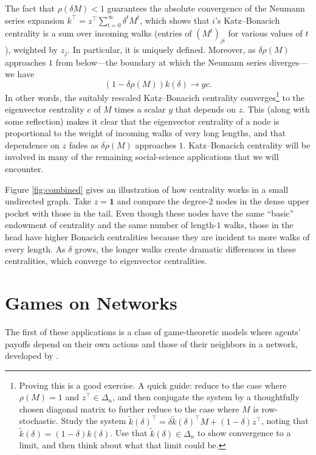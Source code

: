 \documentclass{notices}
\theoremstyle{definition}\newtheorem{problem}{Problem}
\theoremstyle{definition} \newtheorem{remark}{Remark}
\theoremstyle{definition} \newtheorem{claim}{Claim}
\theoremstyle{definition} \newtheorem{thm}{Theorem}
\theoremstyle{definition} \newtheorem*{thmNoNum}{Theorem}
\theoremstyle{definition} \newtheorem{definition}{Definition}
\theoremstyle{definition} \theoremstyle{remark}
\theoremstyle{definition} \newtheorem{note}{Note}
\theoremstyle{definition} \newtheorem{notation}{Notation}
\theoremstyle{definition} \theoremstyle{plain}
\theoremstyle{definition} \newtheorem{condition}{Condition}
\theoremstyle{definition} \newtheorem{lem}{Lemma}
\theoremstyle{definition} \newtheorem{corollary}{Corollary}
\theoremstyle{definition} \newtheorem{prop}{Proposition}
\theoremstyle{definition} \newtheorem{ax}{Axiom}
\theoremstyle{definition} \newtheorem{assumption}{Assumption}
\theoremstyle{definition} \newtheorem{example}{Example}
\theoremstyle{definition} \newtheorem{rmk}{Remark}
\theoremstyle{definition} \newtheorem{res}{Result}
\theoremstyle{definition} \newtheorem{que}{Question}
\theoremstyle{definition} \newtheorem{conjecture}{Conjecture}
\theoremstyle{definition}
\begin{document}
The fact that $\rho(\delta M)<1$ guarantees the absolute convergence of the Neumann series expansion $k^\top = z^\top \sum_{t=0}^\infty \delta^t M^t$, which shows that $i$'s Katz--Bonacich centrality is a sum over incoming walks (entries of $(M^t)_{ji}$ for various values of $t$), weighted by $z_j$. In particular, it is uniquely defined. Moreover, as $\delta \rho(M)$ approaches $1$ from below---the boundary at which the Neumann series diverges---we have $$(1-\delta \rho(M))k(\delta) \to y c.$$ In other words, the suitably rescaled Katz--Bonacich centrality converges\footnote{Proving this is a good exercise. A quick guide: reduce to the case where $\rho(M)=1$ and $z^\top \in \Delta_n$, and then conjugate the system by a thoughtfully chosen diagonal matrix to further reduce to the case where $M$ is row-stochastic. Study the system $\widetilde{k}(\delta)^\top = \delta \widetilde{k}(\delta)^\top M  + (1-\delta)z^\top$, noting that $\widetilde{k}(\delta)=(1-\delta)k(\delta)$. Use that $\widetilde{k}(\delta) \in \Delta_n$ to show convergence to a limit, and then think about what that limit could be.} to the eigenvector centrality $c$ of $M$ times a scalar $y$ that depends on $z$. This (along with some reflection) makes it clear that the eigenvector centrality of a node is proportional to the weight of incoming walks of very long lengths, and that dependence on $z$ fades as $\delta \rho(M)$ approaches $1$. Katz--Bonacich centrality will be involved in many of the remaining social-science applications that we will encounter.


Figure \ref{fig:combined} gives an illustration of how centrality works in a small undirected graph. Take $z=\bm{1}$ and compare the degree-$2$ nodes in the dense upper pocket with those in the tail. Even though these nodes have the same ``basic'' endowment of centrality and the same number of length-$1$ walks, those in the head have higher Bonacich centralities because they are incident to more walks of every length. As $\delta$ grows, the longer walks create dramatic differences in these centralities, which converge to eigenvector centralities.

\section*{Games on Networks}

The first of these applications is a class of game-theoretic models where agents' payoffs depend on their own actions and those of their neighbors in a network, developed by \cite{Ballesteretal2006}.
\end{document}
